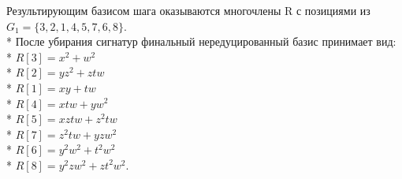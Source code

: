 Результирующим базисом шага оказываются многочлены R с позициями из $G_1=\{3, 2, 1, 4, 5, 7, 6, 8\}$.\\*
После убирания сигнатур финальный нередуцированный базис принимает вид:\\*
$R[3]=x^{2}+w^{2}$\\*
$R[2]=yz^{2}+ztw$\\*
$R[1]=xy+tw$\\*
$R[4]=xtw+yw^{2}$\\*
$R[5]=xztw+z^{2}tw$\\*
$R[7]=z^{2}tw+yzw^{2}$\\*
$R[6]=y^{2}w^{2}+t^{2}w^{2}$\\*
$R[8]=y^{2}zw^{2}+zt^{2}w^{2}$.